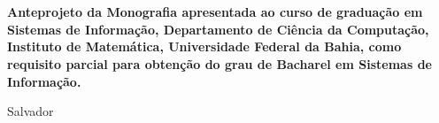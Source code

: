 

\begin{titlepage}
 \vfill
 \begin{center}
   {\large \uppercase{ \bf{ \meunome\ } } } \\[7cm]
   {\Huge \uppercase{ \bf{ \meutitulo\ } } }\\[1cm]
   \vfill
   \hspace{.45\textwidth} %
   \begin{minipage}{.5\textwidth}
     \begin{espacosimples}
       \bf{
	Anteprojeto da Monografia apresentada ao curso de graduação em Sistemas de Informação,
	Departamento de Ciência da Computação, Instituto de Matemática, Universidade Federal da
	Bahia, como requisito parcial para obtenção do grau de Bacharel em Sistemas de Informação. \\
       }
     \end{espacosimples}
     \begin{espacosimples}
       \meuorientador
     \end{espacosimples}
   \end{minipage}
   \vfill
   Salvador \\
   \meuano
 \end{center}
\end{titlepage}
